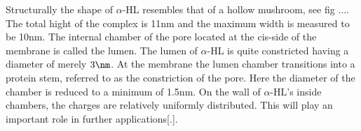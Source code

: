Structurally the shape of $\alpha$-HL resembles that of a hollow mushroom, see fig ....
The total hight of the complex is 11nm and the maximum width is measured to be 10nm. The
internal chamber of the pore located at the cis-side of the membrane is called the lumen.
The lumen of $\alpha$-HL is quite constricted having a diameter of merely $3\nm$.  At the
membrane the lumen chamber transitions into a protein stem, referred to as the
constriction of the pore. Here the diameter of the chamber is reduced to a minimum of
1.5nm. On the wall of $\alpha$-HL's inside chambers, the charges are relatively uniformly
distributed. This will play an important role in further applications[.].
%
%
%
%

